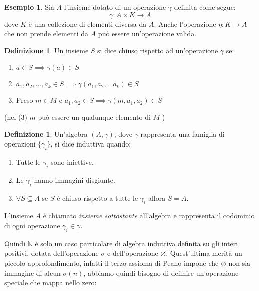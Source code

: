 \documentclass{article}
\theoremstyle{definition}
\theoremstyle{definition}
\theoremstyle{definition}
\newtheorem{definition}[theorem]{Definizione}
\newtheorem{example}[theorem]{Esempio}
\theoremstyle{remark}
\begin{document}
\begin{example}
    Sia $A$ l'insieme dotato di un operazione $\gamma$ definita come segue:
    $$\gamma:  A\times K\to A $$
    dove $K$ è una collezione di elementi diversa da $A$. Anche l'operazione $\eta: K\to A$  che non prende elementi da $A$ può essere un'operazione valida.
\end{example}
\begin{definition}
    Un insieme $S$ si dice chiuso rispetto ad un'operazione $\gamma$ se:
    \begin{enumerate}
        \item $a\in S\implies\gamma(a)\in S$
        \item $a_1,a_2,\dots,a_k\in S\implies \gamma(a_1,a_2,\dots a_k)\in S$
        \item Preso $m\in M$ e $a_1,a_2\in S\implies \gamma(m,a_1,a_2)\in S$
    \end{enumerate}
    (nel (3) $m$ può essere un qualunque elemento di $M$ )
\end{definition}
\begin{definition}
    Un'algebra $(A,\gamma)$, dove $\gamma$ rappresenta una famiglia di operazioni $\{\gamma_i\}$, si dice induttiva quando:
    \begin{enumerate}
        \item Tutte le $\gamma_i$ sono iniettive.
        \item Le $\gamma_i$ hanno immagini disgiunte.
        \item $\forall S\subseteq A$ se $S$ è chiuso rispetto a tutte le  $\gamma_i$ allora $S=A$.
    \end{enumerate}
    L'insieme $A$ è chiamato \textit{insieme sottostante} all'algebra e rappresenta il codominio di ogni operazione $\gamma_i\in \gamma$.
\end{definition}
Quindi $\mathbb{N}$ è solo un caso particolare di algebra induttiva definita su gli interi positivi, dotata dell'operazione $\sigma$ e dell'operazione $\varnothing$.
Quest'ultima merità un piccolo approfondimento, infatti il terzo assioma di Peano impone che $\varnothing$ non sia immagine di alcun $\sigma(n)$, abbiamo quindi bisogno di definire un'operazione speciale
che mappa nello zero:
\end{document}
